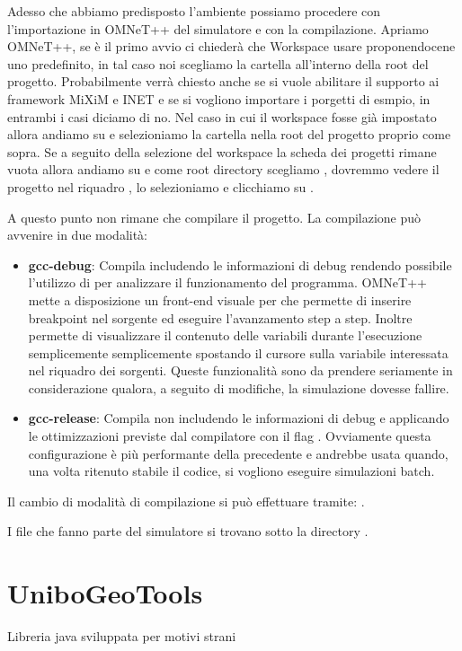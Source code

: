 Adesso che abbiamo predisposto l'ambiente possiamo procedere con l'importazione in OMNeT++ del simulatore e con la compilazione. Apriamo OMNeT++, se è il primo avvio ci chiederà che Workspace usare proponendocene uno predefinito, in tal caso noi scegliamo la cartella  all'interno della root del progetto. Probabilmente verrà chiesto anche se si vuole abilitare il supporto ai framework MiXiM e INET e se si vogliono importare i porgetti di esmpio, in entrambi i casi diciamo di no. Nel caso in cui il workspace fosse già impostato allora andiamo su  e selezioniamo la cartella  nella root del progetto proprio come sopra. Se a seguito della selezione del workspace  la scheda dei progetti rimane vuota allora andiamo su  e come root directory scegliamo , dovremmo vedere il progetto  nel riquadro , lo selezioniamo e clicchiamo su .

A questo punto non rimane che compilare il progetto. La compilazione può avvenire in due modalità:

\begin{itemize}
	\item \textbf{gcc-debug}: Compila includendo le informazioni di debug rendendo possibile l'utilizzo di  per analizzare il funzionamento del programma. OMNeT++ mette a disposizione un front-end visuale per  che permette di inserire breakpoint nel sorgente ed eseguire l'avanzamento step a step. Inoltre permette di visualizzare il contenuto delle variabili durante l'esecuzione semplicemente semplicemente spostando il cursore sulla variabile interessata nel riquadro dei sorgenti. Queste funzionalità sono da prendere seriamente in considerazione qualora, a seguito di modifiche, la simulazione dovesse fallire.
	\item \textbf{gcc-release}: Compila non includendo le informazioni di debug e applicando le ottimizzazioni previste dal compilatore  con il flag . Ovviamente questa configurazione è più performante della precedente e andrebbe usata quando, una volta ritenuto stabile il codice, si vogliono eseguire simulazioni batch.
\end{itemize}

Il cambio di modalità di compilazione si può effettuare tramite: .

I file che fanno parte del simulatore si trovano sotto la directory . 


\chapter{UniboGeoTools}\label{chap:unibo-geo-tools}

Libreria java sviluppata per motivi strani